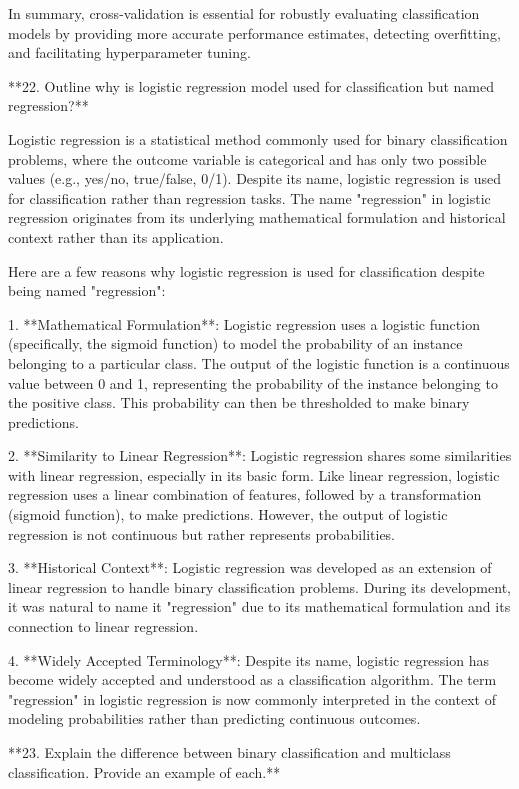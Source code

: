 In summary, cross-validation is essential for robustly evaluating classification models by providing more accurate performance estimates, detecting overfitting, and facilitating hyperparameter tuning.

**22. Outline why is logistic regression model used for classification but named regression?**

Logistic regression is a statistical method commonly used for binary classification problems, where the outcome variable is categorical and has only two possible values (e.g., yes/no, true/false, 0/1). Despite its name, logistic regression is used for classification rather than regression tasks. The name "regression" in logistic regression originates from its underlying mathematical formulation and historical context rather than its application.

Here are a few reasons why logistic regression is used for classification despite being named "regression":

1. **Mathematical Formulation**: Logistic regression uses a logistic function (specifically, the sigmoid function) to model the probability of an instance belonging to a particular class. The output of the logistic function is a continuous value between 0 and 1, representing the probability of the instance belonging to the positive class. This probability can then be thresholded to make binary predictions.

2. **Similarity to Linear Regression**: Logistic regression shares some similarities with linear regression, especially in its basic form. Like linear regression, logistic regression uses a linear combination of features, followed by a transformation (sigmoid function), to make predictions. However, the output of logistic regression is not continuous but rather represents probabilities.

3. **Historical Context**: Logistic regression was developed as an extension of linear regression to handle binary classification problems. During its development, it was natural to name it "regression" due to its mathematical formulation and its connection to linear regression.

4. **Widely Accepted Terminology**: Despite its name, logistic regression has become widely accepted and understood as a classification algorithm. The term "regression" in logistic regression is now commonly interpreted in the context of modeling probabilities rather than predicting continuous outcomes.

**23. Explain the difference between binary classification and multiclass classification. Provide an example of each.**

